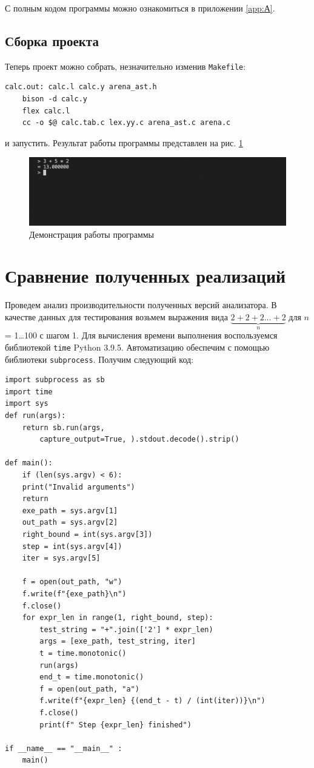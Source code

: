 \documentclass[coursework]{SCWorks}
\begin{document}
С полным кодом программы можно ознакомиться в приложении \ref{app:А}.

\subsection{Сборка проекта}
Теперь проект можно собрать, незначительно изменив \texttt{Makefile}:
\begin{verbatim} 
calc.out: calc.l calc.y arena_ast.h
    bison -d calc.y
    flex calc.l
    cc -o $@ calc.tab.c lex.yy.c arena_ast.c arena.c
\end{verbatim}
и запустить. Результат работы программы представлен на рис. \ref{fig:1}

\begin{figure}[h]

\centering

\includegraphics[scale=0.5]{naivetest.png}

\caption{Демонстрация работы программы}

\label{fig:1}

\end{figure}

\section{Сравнение полученных реализаций}
Проведем анализ производительности полученных версий анализатора. В качестве данных для тестирования возьмем выражения вида $\underbrace{2+2+2\dots+2}_{n}$ для  $n$ =  1\dots100 с шагом 1. Для вычисления времени выполнения воспользуемся библиотекой \texttt{time} Python 3.9.5. Автоматизацию обеспечим с помощью
библиотеки \texttt{subprocess}. Получим следующий код:
\begin{verbatim} 
import subprocess as sb
import time
import sys
def run(args):
    return sb.run(args,
        capture_output=True, ).stdout.decode().strip()

def main():
    if (len(sys.argv) < 6):
    print("Invalid arguments")
    return
    exe_path = sys.argv[1]
    out_path = sys.argv[2]
    right_bound = int(sys.argv[3])
    step = int(sys.argv[4])
    iter = sys.argv[5]

    f = open(out_path, "w")
    f.write(f"{exe_path}\n")
    f.close()
    for expr_len in range(1, right_bound, step):
        test_string = "+".join(['2'] * expr_len)
        args = [exe_path, test_string, iter]
        t = time.monotonic()
        run(args)
        end_t = time.monotonic()
        f = open(out_path, "a")
        f.write(f"{expr_len} {(end_t - t) / (int(iter))}\n")
        f.close()
        print(f" Step {expr_len} finished")

if __name__ == "__main__" :
    main()
\end{verbatim}
\end{document}
